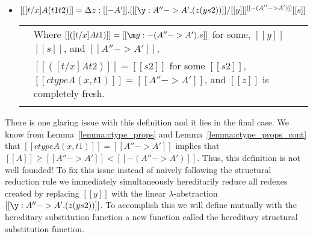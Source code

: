 \begin{definition}
\begin{itemize}
  \item[] $[[ [t/x] A (t1 t2)]] = \Delta z:[[{-A'}]].[ [[\y:A'' -> A'.(z (y s2))]]/[[y]] ]^{[[{-(A''->A')}]]} [[s]]$\\
    \begin{tabular}{lll}
      & Where $[[([t/x] A t1)]] = [[\m y:{-(A''->A')}.s]]$ for some, $[[y]]$ $[[s]]$, 
      and $[[A'' -> A']]$, \\      
      & $[[([t/x] A t2)]] = [[s2]]$ for some $[[s2]]$, $[[ctype A (x,t1)]] = [[A'' -> A']]$, and $[[z]]$ is completely fresh.\\
      & \\
    \end{tabular}  
  \end{itemize}
\end{definition}

There is one glaring issue with this definition and it lies in the final case.  
We know from Lemma~\ref{lemma:ctype_props} and Lemma~\ref{lemma:ctype_props_cont} 
that $[[ctype A (x,t1)]] = [[A'' -> A']]$ 
implies that $[[A]] \geq [[A'' -> A']] < [[{-(A'' ->  A')}]]$. Thus, this 
definition is not well founded!  To fix this issue instead of naively following 
the structural reduction rule we immediately simultaneously hereditarily reduce 
all redexes created by replacing $[[y]]$ with the linear $\lambda$-abstraction
$[[\y:A'' ->A'.(z (y s2))]]$.  To accomplish this we will define mutually with
the hereditary substitution function a new function called the hereditary
structural substitution function.

